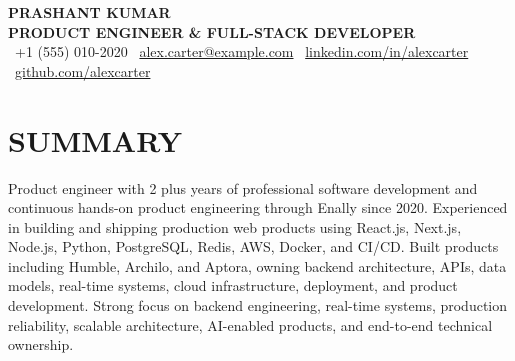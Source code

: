 \documentclass[a4paper,11pt]{article}
\begin{document}
\begin{center}
    {\Huge \textbf{PRASHANT KUMAR}}\\[5pt]
    {\large\textbf{PRODUCT ENGINEER \& FULL-STACK DEVELOPER}}\\[9pt]
    \normalsize
    \textbullet\ +1 (555) 010-2020 \textbullet\ \href{mailto:alex.carter@example.com}{alex.carter@example.com} \textbullet\ \href{https://linkedin.com/in/alexcarter}{linkedin.com/in/alexcarter} \textbullet\ \href{https://github.com/alexcarter}{github.com/alexcarter}
\end{center}
\section*{SUMMARY}
Product engineer with 2 plus years of professional software development and continuous hands-on product engineering through Enally since 2020. Experienced in building and shipping production web products using React.js, Next.js, Node.js, Python, PostgreSQL, Redis, AWS, Docker, and CI/CD. Built products including Humble, Archilo, and Aptora, owning backend architecture, APIs, data models, real-time systems, cloud infrastructure, deployment, and product development. Strong focus on backend engineering, real-time systems, production reliability, scalable architecture, AI-enabled products, and end-to-end technical ownership.
\end{document}
